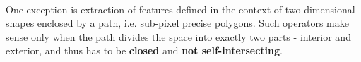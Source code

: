 \paragraph*{}
One exception is extraction of features defined in the context of two-dimensional shapes enclosed by a path, i.e. sub-pixel precise polygons. Such operators make sense only when the path divides the space into exactly two parts - interior and exterior, and thus has to be \textbf{closed} and \textbf{not self-intersecting}.